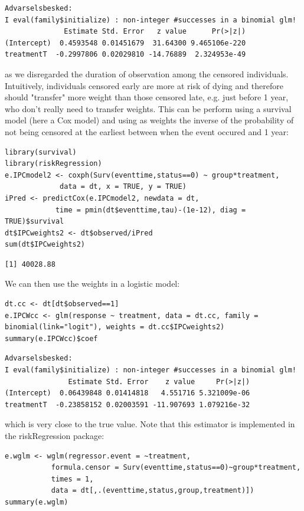 \documentclass[12pt]{article}
\begin{document}
\begin{verbatim}
Advarselsbesked:
I eval(family$initialize) : non-integer #successes in a binomial glm!
              Estimate Std. Error   z value      Pr(>|z|)
(Intercept)  0.4593548 0.01451679  31.64300 9.465106e-220
treatmentT  -0.2997806 0.02029810 -14.76889  2.324953e-49
\end{verbatim}


as we disregarded the duration of observation among the censored
individuals. Intuitively, individuals censored early are more at risk
of dying and therefore should "transfer" more weight than those
censored late, e.g. just before 1 year, who don't really need to
transfer weights. This can be perform using a survival model (here a
Cox model) and using as weights the inverse of the probability of not
being censored at the earliest between when the event occured and 1
year:
\lstset{language=r,label= ,caption= ,captionpos=b,numbers=none}
\begin{lstlisting}
library(survival)
library(riskRegression)
e.IPCmodel2 <- coxph(Surv(eventtime,status==0) ~ group*treatment,
		     data = dt, x = TRUE, y = TRUE)
iPred <- predictCox(e.IPCmodel2, newdata = dt,
		    time = pmin(dt$eventtime,tau)-(1e-12), diag = TRUE)$survival
dt$IPCweights2 <- dt$observed/iPred
sum(dt$IPCweights2)
\end{lstlisting}

\begin{verbatim}
[1] 40028.88
\end{verbatim}


We can then use the weights in a logistic model:
\lstset{language=r,label= ,caption= ,captionpos=b,numbers=none}
\begin{lstlisting}
dt.cc <- dt[dt$observed==1]
e.IPCWcc <- glm(response ~ treatment, data = dt.cc, family = binomial(link="logit"), weights = dt.cc$IPCweights2)
summary(e.IPCWcc)$coef
\end{lstlisting}

\begin{verbatim}
Advarselsbesked:
I eval(family$initialize) : non-integer #successes in a binomial glm!
               Estimate Std. Error    z value     Pr(>|z|)
(Intercept)  0.06439848 0.01414818   4.551716 5.321009e-06
treatmentT  -0.23858152 0.02003591 -11.907693 1.079216e-32
\end{verbatim}


which is very close to the true value. Note that this estimator is
implemented in the riskRegression package:
\lstset{language=r,label= ,caption= ,captionpos=b,numbers=none}
\begin{lstlisting}
e.wglm <- wglm(regressor.event = ~treatment,
	       formula.censor = Surv(eventtime,status==0)~group*treatment,
	       times = 1,
	       data = dt[,.(eventtime,status,group,treatment)])
summary(e.wglm)
\end{lstlisting}
\end{document}
